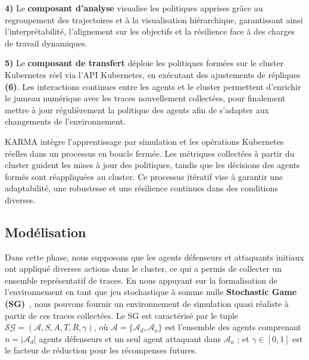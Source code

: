 \textbf{4)} Le \textbf{composant d'analyse} visualise les politiques apprises grâce au regroupement des trajectoires et à la visualisation hiérarchique, garantissant ainsi l'interprétabilité, l'alignement sur les objectifs et la résilience face à des charges de travail dynamiques.

\textbf{5)} Le \textbf{composant de transfert} déploie les politiques formées sur le cluster Kubernetes réel via l'API Kubernetes, en exécutant des ajustements de répliques \textbf{(6)}. Les interactions continues entre les agents et le cluster permettent d'enrichir le jumeau numérique avec les traces nouvellement collectées, pour finalement mettre à jour régulièrement la politique des agents afin de s'adapter aux changements de l'environnement.

KARMA intègre l'apprentissage par simulation et les opérations Kubernetes réelles dans un processus en boucle fermée. Les métriques collectées à partir du cluster guident les mises à jour des politiques, tandis que les décisions des agents formés sont réappliquées au cluster. Ce processus itératif vise à garantir une adaptabilité, une robustesse et une résilience continues dans des conditions diverses.


\subsection{Modélisation}


Dans cette phase, nous supposons que les agents défenseurs et attaquants initiaux ont appliqué diverses actions dans le cluster, ce qui a permis de collecter un ensemble représentatif de traces. En nous appuyant sur la formalisation de l'environnement en tant que jeu stochastique à somme nulle \textbf{Stochastic Game (SG)}~\cite{shapley1953stochastic}, nous pouvons fournir un environnement de simulation quasi réaliste à partir de ces traces collectées. Le SG est caractérisé par le tuple $\mathcal{SG} = (\mathcal{A}, S, A, T, R, \gamma)$, où $\mathcal{A} = \{\mathcal{A}_d, \mathcal{A}_a\}$ est l'ensemble des agents comprenant $n = |\mathcal{A}_d|$ agents défenseurs et un seul agent attaquant dans $\mathcal{A}_a$ ; et $\gamma \in [0, 1]$ est le facteur de réduction pour les récompenses futures.

